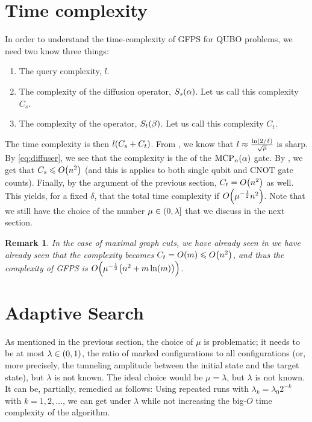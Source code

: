 \documentclass[reqno,10pt]{amsart}
\numberwithin{equation}{section}                %
\let\originalleft\left
\let\originalright\right
\renewcommand{\left}{\mathopen{}\mathclose\bgroup\originalleft}
\renewcommand{\right}{\aftergroup\egroup\originalright}
\def\({\mathopen{}\left(}
\def\){\right)\mathclose{}}
\newtheorem{remark}[theorem]{Remark}
\begin{document}
\bigskip

\section{Time complexity}
\label{sec:time}

In order to understand the time-complexity of GFPS for QUBO problems, we need two know three things:
\begin{enumerate}

   \item The query complexity, $l$.

   \item The complexity of the diffusion operator, $S_s \( \alpha \)$. Let us call this complexity $C_s$.

   \item The complexity of the operator, $S_t \( \beta \)$. Let us call this complexity $C_t$.

\end{enumerate}

The time complexity is then $l \( C_s + C_t \)$. From \cite{yoder_fixed_2014}, we know that $l \approx \tfrac{\ln \( 2 / \delta \)}{\sqrt{\mu}}$ is sharp. By \cref{eq:diffuser}, we see that the complexity is the of the $\mathrm{MCP}_n \( \alpha \)$ gate. By \cite{linear_dasilva_2022}, we get that $C_s \leqslant O \( n^2 \)$ (and this is applies to both single qubit and CNOT gate counts). Finally, by the argument of the previous section, $C_t = O \( n^2 \)$ as well. This yields, for a fixed $\delta$, that the total time complexity if $O \( \mu^{- \frac{1}{2}} n^2 \)$. Note that we still have the choice of the number $\mu \in \( 0, \lambda \right]$ that we discuss in the next section.

\begin{remark}
   In the case of maximal graph cuts, we have already seen in  we have already seen that the complexity becomes $C_t = O \( m \) \leqslant O \( n^2 \)$, and thus the complexity of GFPS is $O \( \mu^{- \frac{1}{2}} \( n^2 + m \ln(m) \) \)$.
\end{remark}

\bigskip

\section{Adaptive Search}
\label{sec:adaptive}

As mentioned in the previous section, the choice of $\mu$ is problematic; it needs to be at most $\lambda \in \( 0, 1 \)$, the ratio of marked configurations to all configurations (or, more precisely, the tunneling amplitude between the initial state and the target state), but $\lambda$ is not known. The ideal choice would be $\mu = \lambda$, but $\lambda$ is not known. It can be, partially, remedied as follows: Using repeated runs with $\lambda_k = \lambda_0 2^{- k}$ with $k = 1, 2, \ldots$, we can get under $\lambda$ while not increasing the big-$O$ time complexity of the algorithm.
\end{document}
